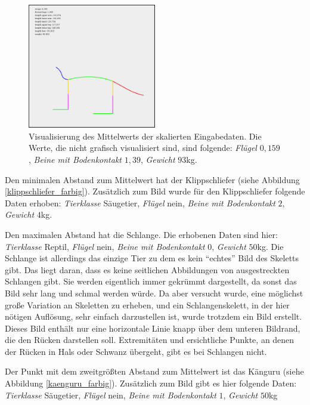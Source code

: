  \begin{figure}
  \centering
  \includegraphics[width=0.5\textwidth]{../PCA/mean_log_weight_downscaled_wings_legs_and_weight(onlyBox,stroke4).jpg}
  \caption{Visualisierung des Mittelwerts der skalierten Eingabedaten. Die Werte, die nicht grafisch visualisiert sind, sind folgende: \emph{Flügel} $0{,}159$, \emph{Beine mit Bodenkontakt} $1{,}39$, \emph{Gewicht} $93$kg.}
  \label{mean}
 \end{figure}
 
 Den minimalen Abstand zum Mittelwert hat der Klippschliefer (siehe Abbildung \ref{klippschliefer_farbig}). Zusätzlich zum Bild wurde für den Klippschliefer folgende Daten erhoben:
 \emph{Tierklasse} Säugetier, \emph{Flügel} nein, \emph{Beine mit Bodenkontakt} $2$, \emph{Gewicht} $4$kg.
 
 Den maximalen Abstand hat die Schlange. Die erhobenen Daten sind hier:
 \emph{Tierklasse} Reptil, \emph{Flügel} nein, \emph{Beine mit Bodenkontakt} $0$, \emph{Gewicht} $50$kg.
 Die Schlange ist allerdings das einzige Tier zu dem es kein "`echtes"' Bild des Skeletts gibt. Das liegt daran, dass es keine seitlichen Abbildungen von ausgestreckten Schlangen gibt. Sie werden eigentlich immer gekrümmt dargestellt, da sonst das Bild sehr lang und schmal werden würde. 
 Da aber versucht wurde, eine möglichst große Variation an Skeletten zu erheben, und ein Schlangenskelett, in der hier nötigen Auflösung, sehr einfach darzustellen ist, wurde trotzdem ein Bild erstellt. Dieses Bild enthält nur eine horizontale Linie knapp über dem unteren Bildrand, die den Rücken darstellen soll. Extremitäten und ersichtliche Punkte, an denen der Rücken in Hals oder Schwanz übergeht, gibt es bei Schlangen nicht.
 
 Der Punkt mit dem zweitgrößten Abstand zum Mittelwert ist das Känguru (siehe Abbildung \ref{kaenguru_farbig}). Zusätzlich zum Bild gibt es hier folgende Daten:
  \emph{Tierklasse} Säugetier, \emph{Flügel} nein, \emph{Beine mit Bodenkontakt} $1$, \emph{Gewicht} $50$kg
  
